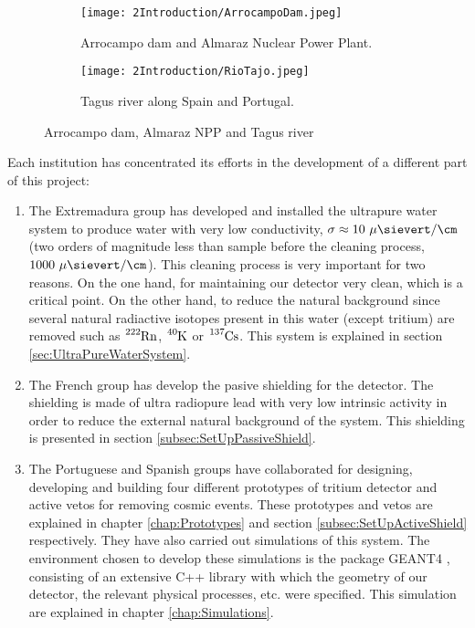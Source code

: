 \begin{figure}
\centering
    \begin{subfigure}[b]{0.45\textwidth}
    \centering
    \texttt{[image: 2Introduction/ArrocampoDam.jpeg]}  
    \caption{Arrocampo dam and Almaraz Nuclear Power Plant.\label{subfig:Arrocampo_Dam}}
    \end{subfigure}
    \hfill
    \begin{subfigure}[b]{0.45\textwidth}
    \centering
    \texttt{[image: 2Introduction/RioTajo.jpeg]}  
    \caption{Tagus river along Spain and Portugal.\label{subfig:TajusRiver}}
    \end{subfigure}
 \caption{Arrocampo dam, Almaraz NPP and Tagus river}
 \label{fig:Arrocampo}
\end{figure}

Each institution has concentrated its efforts in the development of a different part of this project:

\begin{enumerate}
\item{} The Extremadura group has developed and installed the ultrapure water system to produce water with very low conductivity, $\sigma \approx 10~\mu\sievert/\cm$ (two orders of magnitude less than sample before the cleaning process, $1000~\mu\sievert/\cm$). This cleaning process is very important for two reasons. On the one hand, for maintaining our detector very clean, which is a critical point. On the other hand, to reduce the natural background since several natural radiactive isotopes present in this water (except tritium) are removed such as $\ce{^{222}Rn}$, $\ce{^{40}K}$ or $\ce{^{137}Cs}$. This system is explained in section \ref{sec:UltraPureWaterSystem}.

\item{} The French group has develop the pasive shielding for the detector. The shielding is made of ultra radiopure lead with very low intrinsic activity in order to reduce the external natural background of the system. This shielding is presented in section \ref{subsec:SetUpPassiveShield}.

\item{} The Portuguese and Spanish groups have collaborated for designing, developing and building four different prototypes of tritium detector and active vetos for removing cosmic events. These prototypes and vetos are explained in chapter \ref{chap:Prototypes} and section \ref{subsec:SetUpActiveShield} respectively. They have also carried out simulations of this system. The environment chosen to develop these simulations is the package GEANT4 \cite{Geant4WebPage}, consisting of an extensive C++ library with which the geometry of our detector, the relevant physical processes, etc. were specified. This simulation are explained in chapter \ref{chap:Simulations}.

\end{enumerate}

